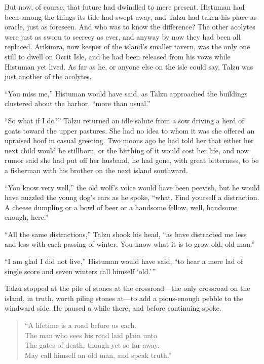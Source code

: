\secdiv

But now, of course, that future had dwindled to mere present. Histuman had been among the things its tide had swept away, and Talzu had taken his place as oracle, just as foreseen. And who was to know the difference? The other acolytes were just as sworn to secrecy as ever, and anyway by now they had been all replaced. Arikimra, now keeper of the island's smaller tavern, was the only one still to dwell on Ocrit Isle, and he had been released from his vows while Histuman yet lived. As far as he, or anyone else on the isle could say, Talzu was just another of the acolytes.

``You miss me,'' Histuman would have said, as Talzu approached the buildings clustered about the harbor, ``more than usual.''

``So what if I do?'' Talzu returned an idle salute from a sow driving a herd of goats toward the upper pastures. She had no idea to whom it was she offered an upraised hoof in casual greeting. Two moons ago he had told her that either her next child would be stillborn, or the birthing of it would cost her life, and now rumor said she had put off her husband, he had gone, with great bitterness, to be a fisherman with his brother on the next island southward.

``You know very well,'' the old wolf's voice would have been peevish, but he would have nuzzled the young dog's ears as he spoke, ``what. Find yourself a distraction. A cheese dumpling or a bowl of beer or a handsome fellow, well, handsome enough, here.''

``All the same distractions,'' Talzu shook his head, ``as have distracted me less and less with each passing of winter. You know what it is to grow old, old man.''

``I am glad I did not live,'' Histuman would have said, ``to hear a mere lad of single score and seven winters call himself `old.'\,''

Talzu stopped at the pile of stones at the crossroad---the only crossroad on the island, in truth, worth piling stones at---to add a pious-enough pebble to the windward side. He paused a while there, and before continuing spoke.

\begin{verse}
``A lifetime is a road before us each. \\
The man who sees his road laid plain unto \\
The gates of death, though yet so far away, \\
May call himself an old man, and speak truth.''
\end{verse}

